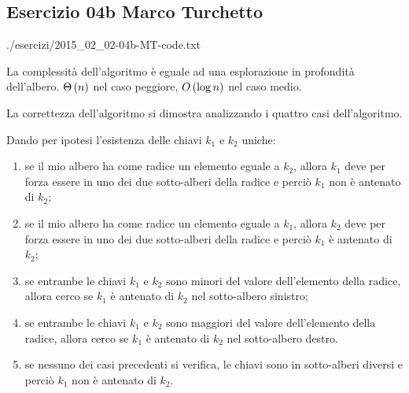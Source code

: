 
\subsection[04b MT]{Esercizio 04b Marco Turchetto}


			{./esercizi/2015_02_02-04b-MT-code.txt}
			
La complessità dell'algoritmo è eguale ad una esplorazione in profondità dell'albero.
$\Theta\left(n\right)$ nel caso peggiore, $O\left(\log n\right)$ nel caso medio.

La correttezza dell'algoritmo si dimostra analizzando i quattro casi dell'algoritmo.

Dando per ipotesi l'esistenza delle chiavi $k_1$ e $k_2$ uniche:

\begin{enumerate}
\item se il mio albero ha come radice un elemento eguale a $k_2$, allora $k_1$ deve per forza essere in uno dei due sotto-alberi della radice e perciò $k_1$ non è antenato di $k_2$;
	
\item se il mio albero ha come radice un elemento eguale a $k_1$, allora $k_2$ deve per forza essere in uno dei due sotto-alberi della radice e perciò $k_1$ è antenato di $k_2$;
	 
\item se entrambe le chiavi $k_1$ e $k_2$ sono minori del valore dell'elemento della radice, allora cerco se $k_1$ è antenato di $k_2$ nel sotto-albero sinistro;
	
\item se entrambe le chiavi $k_1$ e $k_2$ sono maggiori del valore dell'elemento della radice, allora cerco se $k_1$ è antenato di $k_2$ nel sotto-albero destro.
	
\item se nessuno dei casi precedenti si verifica, le chiavi sono in sotto-alberi diversi e perciò $k_1$ non è antenato di $k_2$.
\end{enumerate}
